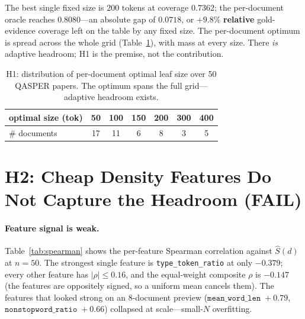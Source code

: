 \documentclass[11pt]{article}
\begin{document}
The best single fixed size is $200$ tokens at coverage $0.7362$; the per-document
oracle reaches $0.8080$---an absolute gap of $0.0718$, or $\mathbf{+9.8\%}$
\textbf{relative} gold-evidence coverage left on the table by any fixed size. The
per-document optimum is spread across the whole grid
(Table~\ref{tab:hetero}), with mass at every size. There \emph{is} adaptive
headroom; H1 is the premise, not the contribution.

\begin{table}[t]
\centering
\caption{H1: distribution of per-document optimal leaf size over 50 QASPER papers.
The optimum spans the full grid---adaptive headroom exists.}
\label{tab:hetero}
\begin{tabular}{lcccccc}
\toprule
optimal size (tok) & 50 & 100 & 150 & 200 & 300 & 400 \\
\midrule
\# documents & 17 & 11 & 6 & 8 & 3 & 5 \\
\bottomrule
\end{tabular}
\end{table}

\section{H2: Cheap Density Features Do Not Capture the Headroom (FAIL)}
\label{sec:h2}

\paragraph{Feature signal is weak.} Table~\ref{tab:spearman} shows the per-feature
Spearman correlation against $\hat S(d)$ at $n{=}50$. The strongest single feature
is \texttt{type\_token\_ratio} at only $-0.379$; every other feature has
$|\rho|\le 0.16$, and the equal-weight composite $\rho$ is $-0.147$ (the features
are oppositely signed, so a uniform mean cancels them). The features that looked
strong on an 8-document preview ($\texttt{mean\_word\_len}\;{+}0.79$,
$\texttt{nonstopword\_ratio}\;{+}0.66$) collapsed at scale---small-$N$
overfitting.
\end{document}
